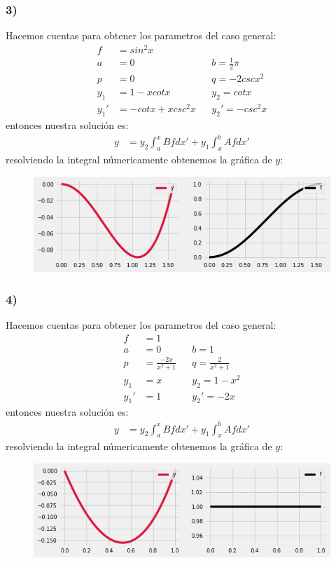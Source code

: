 \documentclass{article}
\begin{document}
\begin{tcolorbox}[breakable]
    \subsubsection*{3)}
    Hacemos cuentas para obtener los parametros del caso general:
    \begin{align*}
        f&= sin^2x \\
        a&=0 &&b=\frac{1}{2}\pi \\
        p&=0 &&q= -2cscx^2 \\
        y_1 &= 1-xcotx  &&y_2= cotx \\
        y_1' &= -cotx + xcsc^2x  &&y_2'= -csc^2x 
    \end{align*}
    entonces nuestra solución es:
    \begin{align*}
        y &=  y_2\int_{a}^x Bf dx' + y_1\int_{x}^b Afdx' 
    \end{align*}
    resolviendo la integral númericamente obtenemos la gráfica de $y$:
    \begin{figure}[H]
        \centering
        \includegraphics[scale=0.7]{images/p3_3.png}
    \end{figure}

    \subsubsection*{4)}
    Hacemos cuentas para obtener los parametros del caso general:
    \begin{align*}
        f&= 1 \\
        a &=0 &&b=1 \\
        p &=\frac{-2x}{x^2+1} &&q= \frac{2}{x^2+1} \\
        y_1 &=x  &&y_2= 1-x^2 \\
        y_1' &=1 &&y_2'= -2x  
    \end{align*}
    entonces nuestra solución es:
    \begin{align*}
        y &=  y_2\int_{a}^x Bf dx' + y_1\int_{x}^b Afdx' 
    \end{align*}
    resolviendo la integral númericamente obtenemos la gráfica de $y$:
    \begin{figure}[H]
        \centering
        \includegraphics[scale=0.7]{images/p3_4.png}
    \end{figure}
\end{tcolorbox}
\newpage
\end{document}
